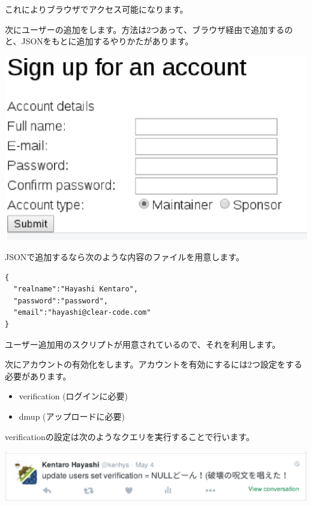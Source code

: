 \documentclass[mingoth,a4paper]{jsarticle}
\begin{document}
これによりブラウザでアクセス可能になります。

次にユーザーの追加をします。方法は2つあって、ブラウザ経由で追加するのと、JSONをもとに追加するやりかたがあります。

\begin{screen}
\includegraphics[width=0.5\hsize]{image201606/debexpo-sign-me-up.eps}
\end{screen}

JSONで追加するなら次のような内容のファイルを用意します。

\begin{screen}
\begin{verbatim}
{
  "realname":"Hayashi Kentaro",
  "password":"password",
  "email":"hayashi@clear-code.com"
}
\end{verbatim}
\end{screen}

ユーザー追加用のスクリプトが用意されているので、それを利用します。


次にアカウントの有効化をします。アカウントを有効にするには2つ設定をする必要があります。

\begin{itemize}
\item verification (ログインに必要)
\item dmup (アップロードに必要)
\end{itemize}

verificationの設定は次のようなクエリを実行することで行います。

\begin{screen}
\includegraphics[width=0.7\hsize]{image201606/update-verification.eps}
\end{screen}
\end{document}
